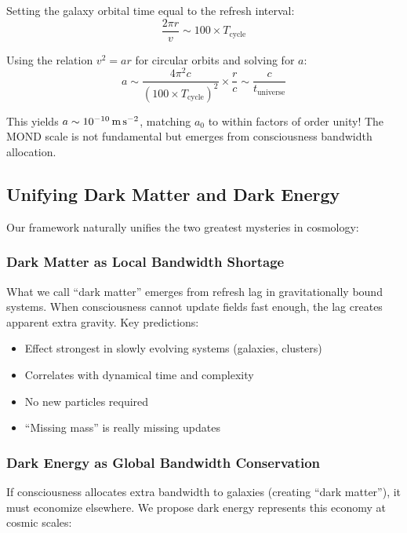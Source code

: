 \documentclass[twocolumn,prd,amsmath,amssymb,aps,superscriptaddress,nofootinbib]{revtex4-2}
\newcommand{\azero}{a_0}
\begin{document}
Setting the galaxy orbital time equal to the refresh interval:
\begin{equation}
\frac{2\pi r}{v} \sim 100 \times T_{\text{cycle}}
\end{equation}

Using the relation $v^2 = a r$ for circular orbits and solving for $a$:
\begin{equation}
a \sim \frac{4\pi^2 c}{(100 \times T_{\text{cycle}})^2} \times \frac{r}{c} \sim \frac{c}{t_{\text{universe}}}
\end{equation}

This yields $a \sim 10^{-10}\,\text{m\,s}^{-2}$, matching $\azero$ to within factors of order unity! The MOND scale is not fundamental but emerges from consciousness bandwidth allocation.

\subsection{Unifying Dark Matter and Dark Energy}

Our framework naturally unifies the two greatest mysteries in cosmology:

\subsubsection{Dark Matter as Local Bandwidth Shortage}

What we call ``dark matter'' emerges from refresh lag in gravitationally bound systems. When consciousness cannot update fields fast enough, the lag creates apparent extra gravity. Key predictions:
\begin{itemize}
\item Effect strongest in slowly evolving systems (galaxies, clusters)
\item Correlates with dynamical time and complexity
\item No new particles required
\item ``Missing mass'' is really missing updates
\end{itemize}

\subsubsection{Dark Energy as Global Bandwidth Conservation}

If consciousness allocates extra bandwidth to galaxies (creating ``dark matter''), it must economize elsewhere. We propose dark energy represents this economy at cosmic scales:
\end{document}
